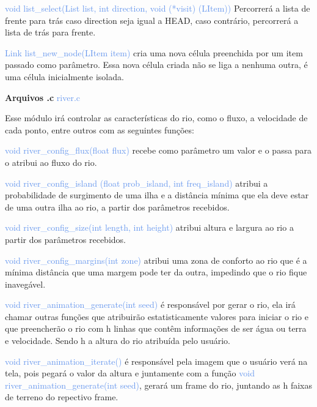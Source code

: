 \documentclass[a4paper,12pt]{article}
\begin{document}
{\textcolor{CornflowerBlue}{void list\_select(List list, int direction, void (*visit) (LItem))}} Percorrerá a lista de frente 
para trás caso direction seja igual a HEAD, caso contrário, percorrerá a lista de trás para frente.

{\textcolor{CornflowerBlue}{Link list\_new\_node(LItem item)}} cria uma nova célula preenchida por um item passado como parâmetro. Essa nova célula criada não se liga a nenhuma outra, é uma célula inicialmente isolada.

\newpage  %

{\Large \textcolor{NavyBlue}{ \textbf{Arquivos .c  }}}{\large \textcolor{CornflowerBlue}{  river.c}}
\bigskip

Esse módulo irá controlar as características do rio, como o fluxo, a velocidade de cada ponto, entre outros com as seguintes funções:

{\textcolor{CornflowerBlue}{void river\_config\_flux(float flux)}} recebe como parâmetro um valor e o passa para o atribui ao fluxo do rio.

{\textcolor{CornflowerBlue}{void river\_config\_island (float prob\_island, int freq\_island)}} atribui a probabilidade de surgimento de uma ilha e a distância mínima que ela deve estar de uma outra ilha ao rio, a partir dos parâmetros recebidos.

{\textcolor{CornflowerBlue}{void river\_config\_size(int length, int height)}} atribui altura e largura ao rio a partir dos parâmetros recebidos. 

{\textcolor{CornflowerBlue}{void river\_config\_margins(int zone)}} atribui uma zona de conforto ao rio que é a mínima distância que uma margem pode ter da outra, impedindo que o rio fique inavegável.

{\textcolor{CornflowerBlue}{void river\_animation\_generate(int seed)}} é responsável por gerar o rio, ela irá chamar outras funções que atribuirão estatisticamente valores para iniciar o rio e que preencherão o rio com h linhas
que contêm informações de ser água ou terra e velocidade. Sendo h a altura do rio atribuída pelo usuário.

{\textcolor{CornflowerBlue}{void river\_animation\_iterate()}} é responsável pela imagem que o usuário verá na tela, pois pegará o valor da altura e juntamente com a função {\textcolor{CornflowerBlue}{void river\_animation\_generate(int seed)}}, gerará um frame do rio, juntando as h faixas de terreno do repectivo frame.
\end{document}
